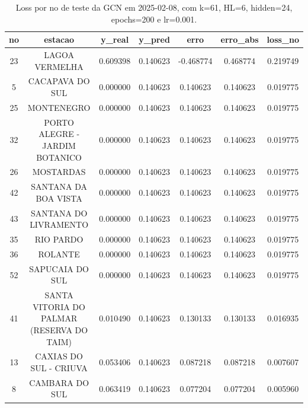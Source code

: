 \begin{table}[h]
\centering
\caption{Loss por no de teste da GCN em 2025-02-08, com k=61, HL=6, hidden=24, epochs=200 e lr=0.001.}
\label{tab:gcn_loss_k61_hl6_h24_e200_d20250208}
\begin{tabular}{ccccccc}
\toprule
no & estacao & y\_real & y\_pred & erro & erro\_abs & loss\_no \\
\midrule
23 & LAGOA VERMELHA & 0.609398 & 0.140623 & -0.468774 & 0.468774 & 0.219749 \\
5 & CACAPAVA DO SUL & 0.000000 & 0.140623 & 0.140623 & 0.140623 & 0.019775 \\
25 & MONTENEGRO & 0.000000 & 0.140623 & 0.140623 & 0.140623 & 0.019775 \\
32 & PORTO ALEGRE - JARDIM BOTANICO & 0.000000 & 0.140623 & 0.140623 & 0.140623 & 0.019775 \\
26 & MOSTARDAS & 0.000000 & 0.140623 & 0.140623 & 0.140623 & 0.019775 \\
42 & SANTANA DA BOA VISTA & 0.000000 & 0.140623 & 0.140623 & 0.140623 & 0.019775 \\
43 & SANTANA DO LIVRAMENTO & 0.000000 & 0.140623 & 0.140623 & 0.140623 & 0.019775 \\
35 & RIO PARDO & 0.000000 & 0.140623 & 0.140623 & 0.140623 & 0.019775 \\
36 & ROLANTE & 0.000000 & 0.140623 & 0.140623 & 0.140623 & 0.019775 \\
52 & SAPUCAIA DO SUL & 0.000000 & 0.140623 & 0.140623 & 0.140623 & 0.019775 \\
41 & SANTA VITORIA DO PALMAR (RESERVA DO TAIM) & 0.010490 & 0.140623 & 0.130133 & 0.130133 & 0.016935 \\
13 & CAXIAS DO SUL - CRIUVA & 0.053406 & 0.140623 & 0.087218 & 0.087218 & 0.007607 \\
8 & CAMBARA DO SUL & 0.063419 & 0.140623 & 0.077204 & 0.077204 & 0.005960 \\
\bottomrule
\end{tabular}
\end{table}
